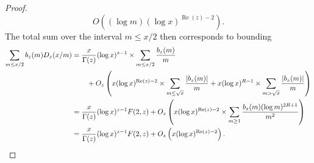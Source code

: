 \documentclass[11pt,reqno,a4letter]{article}
\numberwithin{figure}{section}
\numberwithin{table}{section}
\theoremstyle{plain}
\numberwithin{theorem}{section}
\theoremstyle{definition}
\renewcommand{\Re}{\operatorname{Re}}
\begin{document}
\begin{proof}
\[     O\left((\log m) (\log x)^{\Re(z) - 2}\right). 
\]
The total sum over the interval $m \leq x/2$ then corresponds to bounding 
\begin{align*} 
\sum_{m \leq x/2} b_z(m) D_z(x/m) & = \frac{x}{\Gamma(z)} (\log x)^{z-1} \times 
     \sum_{m \leq x/2} \frac{b_z(m)}{m} \\ 
     & \phantom{=\quad\ } + 
     O_z\left(x (\log x)^{\Re(z)-2} \times \sum_{m \leq \sqrt{x}} \frac{|b_z(m)|}{m} + 
     x (\log x)^{R-1} \times \sum_{m > \sqrt{x}} \frac{|b_z(m)|}{m}\right) \\ 
     & = \frac{x}{\Gamma(z)} (\log x)^{z-1} F(2, z) + O_z\left( 
     x (\log x)^{\Re(z)-2} \times \sum_{m \geq 1} \frac{b_z(m) (\log m)^{2R+1}}{m^2} 
     \right) \\ 
     & = \frac{x}{\Gamma(z)} (\log x)^{z-1} F(2, z) + O_z\left( 
     x (\log x)^{\Re(z)-2}\right). 
     \qedhere  
\end{align*} 
\end{proof} 
\end{document}
